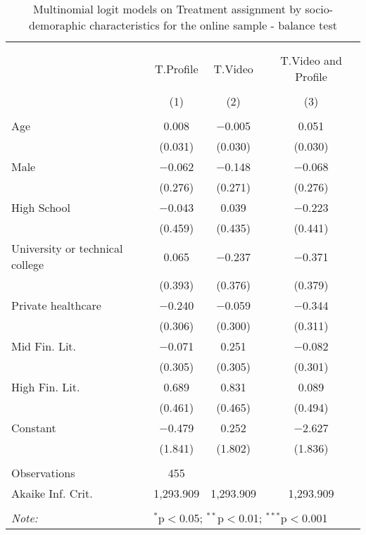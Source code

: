 
\begin{table}[H] \centering 
  \caption{Multinomial logit models on Treatment assignment by socio-demoraphic characteristics for the online sample - balance test} 
  \label{tbl:balance_online} 
\begin{tabular}{@{\extracolsep{5pt}}lccc} 
\\[-1.8ex]\hline 
\hline \\[-1.8ex] 
\\[-1.8ex] & T.Profile & T.Video & T.Video and Profile \\ 
\\[-1.8ex] & (1) & (2) & (3)\\ 
\hline \\[-1.8ex] 
 Age & 0.008 & $-$0.005 & 0.051 \\ 
  & (0.031) & (0.030) & (0.030) \\ 
  Male & $-$0.062 & $-$0.148 & $-$0.068 \\ 
  & (0.276) & (0.271) & (0.276) \\ 
  High School & $-$0.043 & 0.039 & $-$0.223 \\ 
  & (0.459) & (0.435) & (0.441) \\ 
  University or technical college & 0.065 & $-$0.237 & $-$0.371 \\ 
  & (0.393) & (0.376) & (0.379) \\ 
  Private healthcare & $-$0.240 & $-$0.059 & $-$0.344 \\ 
  & (0.306) & (0.300) & (0.311) \\ 
  Mid Fin. Lit. & $-$0.071 & 0.251 & $-$0.082 \\ 
  & (0.305) & (0.305) & (0.301) \\ 
  High Fin. Lit. & 0.689 & 0.831 & 0.089 \\ 
  & (0.461) & (0.465) & (0.494) \\ 
  Constant & $-$0.479 & 0.252 & $-$2.627 \\ 
  & (1.841) & (1.802) & (1.836) \\ 
 \hline \\[-1.8ex] 
Observations & 455 &  &  \\ 
Akaike Inf. Crit. & 1,293.909 & 1,293.909 & 1,293.909 \\ 
\hline 
\hline \\[-1.8ex] 
\textit{Note:}  & \multicolumn{3}{l}{$^{*}$p$<$0.05; $^{**}$p$<$0.01; $^{***}$p$<$0.001} \\ 
\end{tabular} 
\end{table} 
